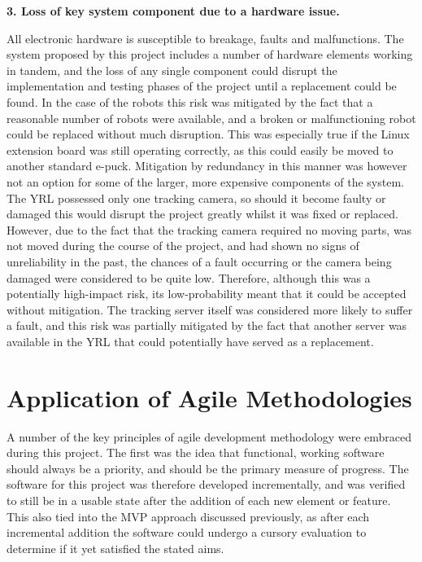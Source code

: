 \textbf{3. Loss of key system component due to a hardware issue.}

All electronic hardware is susceptible to breakage, faults and malfunctions. The system proposed by this project includes a number of hardware elements working in tandem, and the loss of any single component could disrupt the implementation and testing phases of the project until a replacement could be found. In the case of the robots this risk was mitigated by the fact that a reasonable number of robots were available, and a broken or malfunctioning robot could be replaced without much disruption. This was especially true if the Linux extension board was still operating correctly, as this could easily be moved to another standard e-puck. Mitigation by redundancy in this manner was however not an option for some of the larger, more expensive components of the system. The YRL possessed only one tracking camera, so should it become faulty or damaged this would disrupt the project greatly whilst it was fixed or replaced. However, due to the fact that the tracking camera required no moving parts, was not moved during the course of the project, and had shown no signs of unreliability in the past, the chances of a fault occurring or the camera being damaged were considered to be quite low. Therefore, although this was a potentially high-impact risk, its low-probability meant that it could be accepted without mitigation. The tracking server itself was considered more likely to suffer a fault, and this risk was partially mitigated by the fact that another server was available in the YRL that could potentially have served as a replacement.


\section{Application of Agile Methodologies} \label{Agile}

A number of the key principles of agile development methodology were embraced during this project. The first was the idea that functional, working software should always be a priority, and should be the primary measure of progress. The software for this project was therefore developed incrementally, and was verified to still be in a usable state after the addition of each new element or feature. This also tied into the MVP approach discussed previously, as after each incremental addition the software could undergo a cursory evaluation to determine if it yet satisfied the stated aims. 

